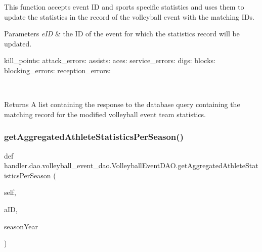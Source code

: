 This function accepts event ID and sports specific statistics and uses them to update the statistics in the record of the volleyball event with the matching I\+Ds.


\begin{DoxyParams}{Parameters}
{\em e\+ID} & the ID of the event for which the statistics record will be updated. \begin{DoxyVerb}       kill_points:
       attack_errors:
       assists:
       aces:
       service_errors:
       digs:
       blocks:
       blocking_errors:
       reception_errors:
\end{DoxyVerb}
\\
\hline
\end{DoxyParams}
\begin{DoxyReturn}{Returns}
A list containing the response to the database query containing the matching record for the modified volleyball event team statistics. 
\end{DoxyReturn}
\mbox{\label{classhandler_1_1dao_1_1volleyball__event__dao_1_1_volleyball_event_d_a_o_a06690eb7967d2674284ddf507e41c914}} 
\subsubsection{\texorpdfstring{get\+Aggregated\+Athlete\+Statistics\+Per\+Season()}{getAggregatedAthleteStatisticsPerSeason()}}
{\footnotesize\ttfamily def handler.\+dao.\+volleyball\+\_\+event\+\_\+dao.\+Volleyball\+Event\+D\+A\+O.\+get\+Aggregated\+Athlete\+Statistics\+Per\+Season (\begin{DoxyParamCaption}\item[{}]{self,  }\item[{}]{a\+ID,  }\item[{}]{season\+Year }\end{DoxyParamCaption})}



